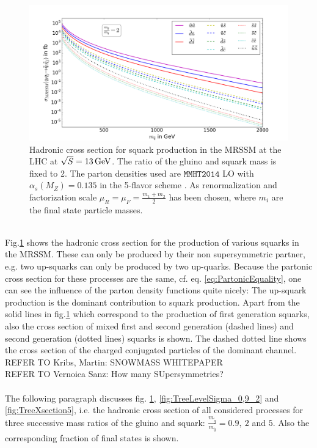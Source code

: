 \begin{figure}[!htpb]
\begin{center}
\includegraphics[scale=.45]{figures/MRSSM:q+q->sq+sq_mr=2_seperated}
\caption{Hadronic cross section for squark production in the MRSSM at the LHC at $\sqrt{S} = \unit[13]{GeV}$. The ratio of the gluino and squark mass is fixed to 2. The parton densities used are $\mathtt{MMHT2014}$ LO with $\alpha_s(M_Z) = 0.135$ in the 5-flavor scheme \cite{Harland-Lang:2014zoa}. As renormalization and factorization scale $\mu_R = \mu_F = \frac{m_1 + m_2}{2}$ has been chosen, where $m_i$ are the final state particle masses.} \label{fig:TreeXsection}
\end{center}
\end{figure}\\
Fig.\ref{fig:TreeXsection} shows the hadronic cross section for the production of various squarks in the MRSSM. These can only be produced by their non supersymmetric partner, e.g. two up-squarks can only be produced by two up-quarks. Because the partonic cross section for these processes are  the same, cf. eq. \ref{eq:PartonicEquality}, one can see the influence of the parton density functions quite nicely: The up-squark production is the dominant contribution to squark production. Apart from the solid lines in fig.\ref{fig:TreeXsection} which correspond to the production of first generation squarks, also the cross section of mixed first and second generation (dashed lines) and second generation (dotted lines) squarks is shown. The dashed dotted line shows the cross section of the charged conjugated particles of the dominant channel.\\
REFER TO Kribs, Martin: SNOWMASS WHITEPAPER\\
REFER TO Vernoica Sanz: How many SUpersymmetries?\\
\\
The following paragraph discusses fig. \ref{fig:TreeXsection}, \ref{fig:TreeLevelSigma_0,9_2} and \ref{fig:TreeXsection5}, i.e. the hadronic cross section of all considered processes for three successive mass ratios of the gluino and squark: $\frac{m_{\tilde{g}}}{m_{\tilde{q}}} = 0.9,\ 2$ and $5$. Also the corresponding fraction of final states is shown.\\
